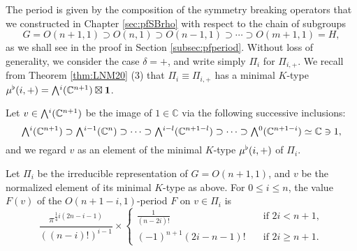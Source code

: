 The period is given by the composition 
 of the symmetry breaking operators
 that we constructed in Chapter \ref{sec:pfSBrho}
 with respect to the chain
 of subgroups
\begin{equation}
\label{eqn:seqOn}
  G=O(n+1,1) \supset O(n,1) \supset O(n-1,1) \supset \cdots \supset O(m+1,1)=H,
\end{equation}
 as we shall see in the proof
 in Section \ref{subsec:pfperiod}.  
Without loss of generality,
 we consider the case $\delta=+$, 
 and write simply $\Pi_i$ for $\Pi_{i,+}$.  
We recall from Theorem \ref{thm:LNM20} (3)
 that $\Pi_i \equiv \Pi_{i,+}$ has a 
minimal $K$-type
 $\mub(i,+)=\Exterior^i({\mathbb{C}}^{n+1}) \boxtimes {\bf{1}}$. 



Let $v\in \Exterior^i({\mathbb{C}}^{n+1})$ be the image of $1 \in {\mathbb{C}}$
 via the following successive inclusions:
\[
   \Exterior^{i}({\mathbb{C}}^{n+1}) \supset 
   \Exterior^{i-1}({\mathbb{C}}^{n}) \supset 
   \cdots \supset
   \Exterior^{i-l}({\mathbb{C}}^{n+1-l}) \supset 
   \cdots \supset 
  \Exterior^{0}({\mathbb{C}}^{n+1-i}) \simeq {\mathbb{C}} \ni 1, 
\]
 and we regard $v$ as an element
 of the minimal $K$-type $\mu^{\flat}(i,+)$
 of $\Pi_i$.  

\begin{theorem}
\label{thm:period2}
Let $\Pi_i$ be the irreducible representation of $G=O(n+1,1)$, 
 and $v$ be the normalized element
 of its minimal $K$-type as above.  
For $0 \le i \le n$, 
 the value $F(v)$ of the $O(n+1-i,1)$-period $F$ 
 on $v \in \Pi_i$ is
\[
  \frac{\pi^{\frac 1 4 i(2n-i-1)}}{((n-i)!)^{i-1}}
  \times
\begin{cases}  
  \frac{1}{(n-2i)!}\quad &\text{if $2i < n+1$}, 
\\
  (-1)^{n+1} (2i-n-1)!\quad & \text{if $2i \ge n+1$}.  
\end{cases}
\]
\end{theorem} 

